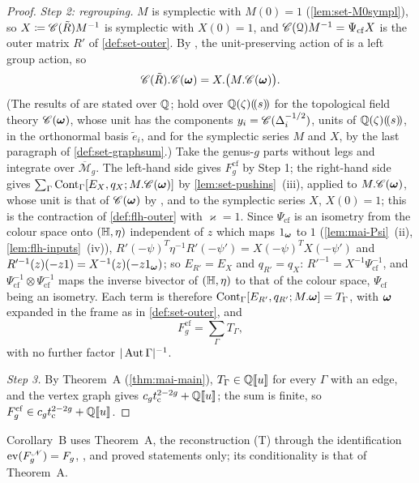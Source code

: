 \begin{proof}
\emph{Step 2: regrouping.} $M$ is symplectic with $M(0)=1$ (\cref{lem:set-M0sympl}), so $X\coloneqq\mathscr{C}(\tilde R)M^{-1}$ is symplectic with $X(0)=1$, and $\mathscr{C}(\mathcal{Q})M^{-1}=\Psi_{\mathrm{cf}}X$ is the outer matrix $R'$ of \cref{def:set-outer}. By \cite[Prop.~2.14]{PPZ15}, the unit-preserving action of \cite[Def.~2.13]{PPZ15} is a left group action, so
\[
\mathscr{C}(\tilde R).\mathscr{C}(\boldsymbol{\omega})=X.\bigl(M.\mathscr{C}(\boldsymbol{\omega})\bigr).
\]
(The results of \cite{PPZ15} are stated over $\mathbb{Q}$; \cite[Props.~2.12 and~2.14]{PPZ15} hold over $\mathbb{Q}(\zeta)(\!(s)\!)$ for the topological field theory $\mathscr{C}(\boldsymbol{\omega})$, whose unit has the components $y_i=\mathscr{C}(\Delta_i^{-1/2})$, units of $\mathbb{Q}(\zeta)(\!(s)\!)$, in the orthonormal basis $\tilde e_i$, and for the symplectic series $M$ and $X$, by the last paragraph of \cref{def:set-graphsum}.) Take the genus-$g$ parts without legs and integrate over $\overline{\mathcal M}_g$. The left-hand side gives $F_g^{\mathrm{cf}}$ by Step 1; the right-hand side gives $\sum_\Gamma\mathrm{Cont}_\Gamma[E_X,q_X;M.\mathscr{C}(\boldsymbol{\omega})]$ by \cref{lem:set-pushins}~(iii), applied to $M.\mathscr{C}(\boldsymbol{\omega})$, whose unit is that of $\mathscr{C}(\boldsymbol{\omega})$ by \cite[Prop.~2.12]{PPZ15}, and to the symplectic series $X$, $X(0)=1$; this is the contraction of \cref{def:flh-outer} with $\varkappa=1$. Since $\Psi_{\mathrm{cf}}$ is an isometry from the colour space onto $(\mathbb{H},\eta)$ independent of $z$ which maps $1_{\boldsymbol{\omega}}$ to $1$ (\cref{lem:mai-Psi}~(ii), \cref{lem:flh-inputs}~(iv)), $R'(-\psi)^T\eta^{-1}R'(-\psi')=X(-\psi)^TX(-\psi')$ and $R'^{-1}(z)(-z1)=X^{-1}(z)(-z1_{\boldsymbol{\omega}})$; so $E_{R'}=E_X$ and $q_{R'}=q_X$: $R'^{-1}=X^{-1}\Psi_{\mathrm{cf}}^{-1}$, and $\Psi_{\mathrm{cf}}^{-1}\otimes\Psi_{\mathrm{cf}}^{-1}$ maps the inverse bivector of $(\mathbb{H},\eta)$ to that of the colour space, $\Psi_{\mathrm{cf}}$ being an isometry. Each term is therefore $\mathrm{Cont}_\Gamma[E_{R'},q_{R'};M.\boldsymbol{\omega}]=T_\Gamma$, with $\boldsymbol{\omega}$ expanded in the frame as in \cref{def:set-outer}, and
\[
F_g^{\mathrm{cf}}=\sum_\Gamma T_\Gamma ,
\]
with no further factor $|\operatorname{Aut}\Gamma|^{-1}$.

\emph{Step 3.} By Theorem~A (\cref{thm:mai-main}), $T_\Gamma\in\mathbb{Q}[\![ u ]\!]$ for every $\Gamma$ with an edge, and the vertex graph gives $c_gt_{\mathrm{c}}^{2-2g}+\mathbb{Q}[\![ u ]\!]$; the sum is finite, so $F_g^{\mathrm{cf}}\in c_gt_{\mathrm{c}}^{2-2g}+\mathbb{Q}[\![ u ]\!]$.
\end{proof}

Corollary~B uses Theorem~A, the reconstruction (T) through the identification $\operatorname{ev}(F_g^{\mathscr{N}})=F_g$, \cite[\S0.2, (1); Def.~0.3, in particular (iii); (5); Rem.~2.1 and (6); Defs.~2.2 and~2.5, with the conventions stated after them; (8); Prop.~2.12; Def.~2.13; Prop.~2.14]{PPZ15}, and proved statements only; its conditionality is that of Theorem~A.

